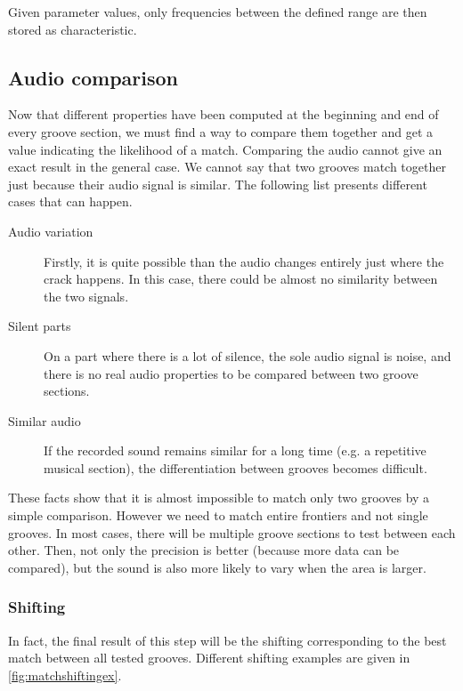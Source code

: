 Given parameter values, only frequencies between the defined range are then stored as characteristic.

\subsection{Audio comparison}

Now that different properties have been computed at the beginning and end of every groove section, we must find a way to compare them together and get a value indicating the likelihood of a match. Comparing the audio cannot give an exact result in the general case. We cannot say that two grooves match together just because their audio signal is similar. The following list presents different cases that can happen.

\begin{description}
\item[Audio variation] Firstly, it is quite possible than the audio changes entirely just where the crack happens. In this case, there could be almost no similarity between the two signals.
\item[Silent parts] On a part where there is a lot of silence, the sole audio signal is noise, and there is no real audio properties to be compared between two groove sections.
\item[Similar audio] If the recorded sound remains similar for a long time (e.g. a repetitive musical section), the differentiation between grooves becomes difficult.
\end{description}

These facts show that it is almost impossible to match only two grooves by a simple comparison. However we need to match entire frontiers and not single grooves. In most cases, there will be multiple groove sections to test between each other. Then, not only the precision is better (because more data can be compared), but the sound is also more likely to vary when the area is larger.

\subsubsection{Shifting}

In fact, the final result of this step will be the shifting corresponding to the best match between all tested grooves. Different shifting examples are given in \autoref{fig:matchshiftingex}.

